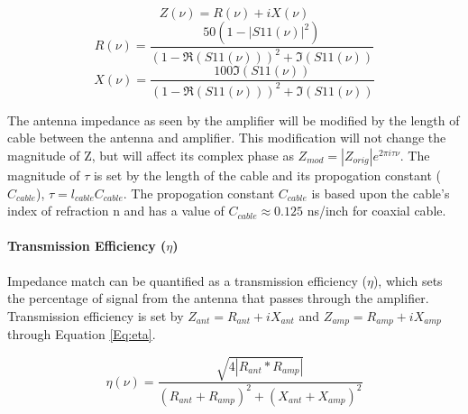 \begin{equation}\label{Eq:Imp_calc}
Z(\nu) = R(\nu)+ i X(\nu) 
\end{equation}
\begin{equation}
R(\nu) = \frac{50 (1-|S11(\nu)|^2)}{(1-\Re(S11(\nu)))^2 + \Im(S11(\nu))} 
\end{equation}
\begin{equation}
X(\nu) = \frac{100 \Im(S11(\nu))}{(1-\Re(S11(\nu)))^2 + \Im(S11(\nu))} 
\end{equation}

The antenna impedance as seen by the amplifier will be modified by the length of cable between the antenna and amplifier. This modification will not change the magnitude of Z, but will affect its complex phase as $Z_{mod} = |Z_{orig}| e^{2 \pi i \tau \nu }$. The magnitude of $\tau$ is set by the length of the cable and its propogation constant ($C_{cable}$), $\tau = l_{cable} C_{cable}$. The propogation constant $C_{cable}$ is based upon the cable's index of refraction n and has a value of $C_{cable} \approx 0.125$ ns/inch for coaxial cable. 

\paragraph{Transmission Efficiency ($\eta$)}
Impedance match can be quantified as a transmission efficiency ($\eta$), which sets the percentage of signal from the antenna that passes through the amplifier. Transmission efficiency is set by $Z_{ant}= R_{ant}+i X_{ant}$ and $Z_{amp} = R_{amp} + i X_{amp}$ through Equation \ref{Eq:eta}. 

\begin{equation} \label{Eq:eta}
\eta (\nu) = \frac{\sqrt{4 |R_{ant}*R_{amp}|}}{(R_{ant}+R_{amp})^2+(X_{ant}+X_{amp})^2}
\end{equation}

